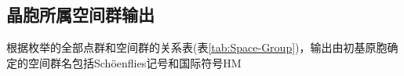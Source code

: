 \documentclass{article}      %
\begin{document}
\subsection{晶胞所属空间群输出}
根据枚举的全部点群和空间群的关系表(表\ref{tab:Space-Group})，输出由初基原胞确定的空间群名包括\textrm{Sch\"oenflies}记号和国际符号\textrm{HM}
\end{document}
